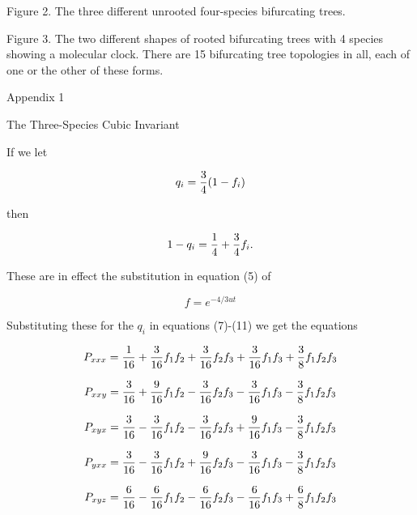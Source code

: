 Figure 2.  The three different unrooted four-species bifurcating trees.

\medskip

Figure 3.  The two different shapes of rooted bifurcating trees with 4 species
showing a molecular clock.  There are 15 bifurcating tree topologies in all,
each of one or the other of these forms.

\newpage

\centerline{Appendix 1}
\medskip

\centerline{The Three-Species Cubic Invariant}
\medskip

If we let

\begin{equation}
q_i = {3 \over 4} (1-f_i)
\end{equation}

then

\begin{equation}
1-q_i = {1 \over 4} + {3 \over 4} f_i.
\end{equation}

These are in effect the substitution in equation (5) of

\begin{equation}
f  = e^{- 4/3 u t}
\end{equation}

Substituting these for the $q_i$ in equations (7)-(11) we get the equations

\begin{equation}
P_{xxx}  =  {1 \over 16} + {3 \over 16} f_1f_2 + {3 \over 16}f_2f_3 + {3 \over 
16} f_1f_3 + {3 \over 8} f_1f_2f_3
\end{equation}

\begin{equation}
P_{xxy}  =  {3 \over 16} + {9 \over 16} f_1f_2 - {3 \over 16}f_2f_3 - {3 \over 
16} f_1f_3 - {3 \over 8} f_1f_2f_3
\end{equation}

\begin{equation}
P_{xyx}  =  {3 \over 16} - {3 \over 16} f_1f_2 - {3 \over 16}f_2f_3 + {9 \over 
16} f_1f_3 - {3 \over 8} f_1f_2f_3
\end{equation}

\begin{equation}
P_{yxx}  =  {3 \over 16} - {3 \over 16} f_1f_2 + {9 \over 16}f_2f_3 - {3 \over 
16} f_1f_3 - {3 \over 8} f_1f_2f_3
\end{equation}

\begin{equation}
P_{xyz}  =  {6 \over 16} - {6 \over 16} f_1f_2 - {6 \over 16}f_2f_3 - {6 \over 
16} f_1f_3 + {6 \over 8} f_1f_2f_3
\end{equation}
\medskip

